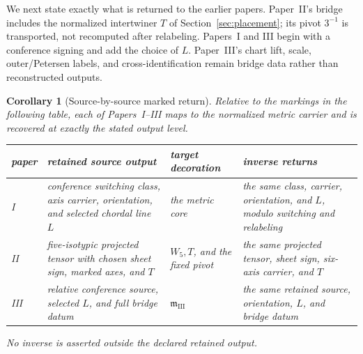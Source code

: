 \documentclass[11pt]{article}
\newtheorem{corollary}[theorem]{Corollary}
\theoremstyle{definition}
\theoremstyle{remark}
\begin{document}
We next state exactly what is returned to the earlier papers.  Paper~II's
bridge includes the normalized intertwiner \(T\) of
Section~\ref{sec:placement}; its pivot \(3^{-1}\) is transported, not
recomputed after relabeling.  Papers~I and III begin with a conference
signing and add the choice of \(L\).  Paper~III's chart lift, scale,
outer/Petersen labels, and cross-identification remain bridge data rather
than reconstructed outputs.

\begin{corollary}[Source-by-source marked return]
\label{cor:source-by-source-return}
Relative to the markings in the following table, each of Papers~I--III maps
to the normalized metric carrier and is recovered at exactly the stated
output level.
\begin{center}
\small
\renewcommand{\arraystretch}{1.15}
\begin{tabular}{@{}>{\centering\arraybackslash}p{}
  >{\raggedright\arraybackslash}p{}
  >{\raggedright\arraybackslash}p{}
  >{\raggedright\arraybackslash}p{}@{}}
\toprule
paper & retained source output & target decoration & inverse returns\\
\midrule
I & conference switching class, axis carrier, orientation, and selected
  chordal line \(L\) & the metric core & the same class, carrier,
  orientation, and \(L\), modulo switching and relabeling\\
II & five-isotypic projected tensor with chosen sheet sign, marked axes, and
  \(T\) & \(W_5,T\), and the fixed pivot & the same projected tensor, sheet
  sign, six-axis carrier, and \(T\)\\
III & relative conference source, selected \(L\), and full bridge datum &
  \(\mathfrak m_{\mathrm{III}}\) & the same retained source, orientation,
  \(L\), and bridge datum\\
\bottomrule
\end{tabular}
\end{center}
No inverse is asserted outside the declared retained output.
\end{corollary}
\end{document}
